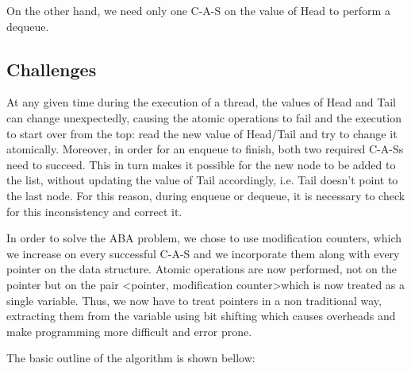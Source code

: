 On the other hand, we need only one C-A-S on the value of Head to perform a dequeue.

\subsection{Challenges}
At any given time during the execution of a thread, the values of Head and Tail can change unexpectedly, causing the atomic operations to fail and the execution to start over from the top: read the new value of Head/Tail and try to change it atomically. Moreover, in order for an enqueue to finish, both two required C-A-Ss need to succeed. This in turn makes it possible for the new node to be added to the list, without updating the value of Tail accordingly, i.e. Tail doesn't point to the last node. For  this reason, during enqueue or dequeue, it is necessary to check for this inconsistency and correct it.


In order to solve the ABA problem, we chose to use modification counters, which we increase on every successful C-A-S and we incorporate them along with every pointer on the data structure. Atomic operations are now performed, not on the pointer but on the pair \textless pointer, modification counter\textgreater which is now treated as a single variable. Thus, we now have to treat pointers in a non traditional way, extracting them from the variable using bit shifting which causes overheads and make programming more difficult and error prone. 


The basic outline of the algorithm is shown bellow:

